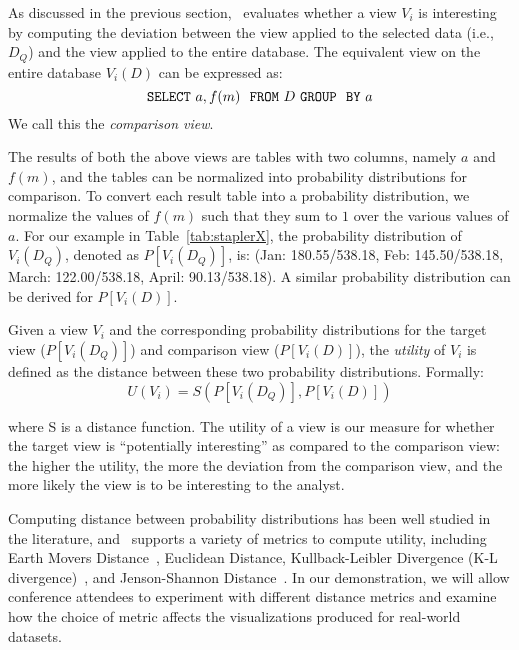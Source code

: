 As discussed in the previous section, \SeeDB\ evaluates
whether a view $V_i$ is interesting
by computing the deviation between the view applied to the selected data (i.e., $D_Q$) 
and the view applied to the entire database.
The equivalent view on the entire database $V_i (D)$ can be expressed as:
$${\tt SELECT \ } a, f(m) \ \ {\tt FROM} \  D\  {\tt GROUP \ \ BY} \ a$$
We call this the {\em comparison view}.

The results of both the above views are tables with two columns, namely $a$ and
$f(m)$, and the tables can be normalized into probability distributions for
comparison. To convert each result table into a probability distribution, we
normalize the values of $f(m)$ such that they sum to $1$ over the various values
of $a$.
For our example in Table~\ref{tab:staplerX}, the probability distribution of
$V_i(D_Q)$, denoted as $P[V_i (D_Q)]$, is: (Jan: 180.55/538.18, Feb:
145.50/538.18, March: 122.00/538.18,  April: 90.13/538.18). A similar
probability distribution can be derived for $P[V_i (D)]$.

Given a view $V_i$ and the corresponding probability distributions for the
target view  ($P[V_i (D_Q)]$) and comparison view ($P[V_i (D)]$), the
{\em utility} of $V_i$ is defined as the distance between these two probability
distributions.
Formally:
$$ U (V_i) = S ( P[V_i (D_Q)], P[V_i (D)] )$$

where S is a distance function. The utility of a view is our measure for whether
the target view is ``potentially interesting'' as compared to the comparison view: 
the higher the utility, the more the deviation
from the comparison view, and the more likely the view is to be interesting to the analyst.

Computing distance between probability distributions has
been well studied in the literature, and \SeeDB\ supports a variety of metrics
to compute utility, including Earth Movers Distance~\cite{wikipedia-prob-dist}, 
Euclidean Distance, Kullback-Leibler Divergence (K-L
divergence)~\cite{wikipedia-KL}, and Jenson-Shannon
Distance~\cite{wikipedia-JS,entropy-vis}. 
In our demonstration, we will allow conference attendees to experiment with
different distance metrics and examine how the choice of metric affects the
visualizations produced for real-world datasets.

